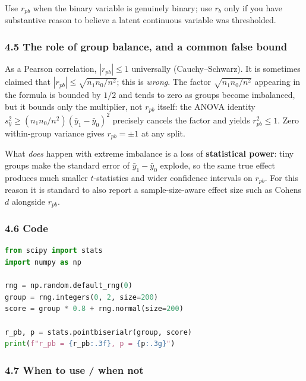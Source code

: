 \documentclass{article}
\begin{document}
Use \(r_{pb}\) when the binary variable is genuinely binary; use \(r_b\)
only if you have substantive reason to believe a latent continuous
variable was thresholded.

\subsubsection{\texorpdfstring{4.5 The role of group balance, and a
common false bound}{4.5 The role of group balance, and a common false bound}}\label{45-bound-on-r_pb}

As a Pearson correlation, \(|r_{pb}| \leq 1\) universally
(Cauchy--Schwarz). It is sometimes claimed that
\(|r_{pb}| \leq \sqrt{n_1 n_0 / n^2}\); this is \emph{wrong}. The factor
\(\sqrt{n_1 n_0 / n^2}\) appearing in the formula is bounded by \(1/2\)
and tends to zero as groups become imbalanced, but it bounds only the
multiplier, not \(r_{pb}\) itself: the ANOVA identity
\(s_y^2 \geq (n_1 n_0 / n^2)(\bar{y}_1 - \bar{y}_0)^2\) precisely
cancels the factor and yields \(r_{pb}^2 \leq 1\). Zero within-group
variance gives \(r_{pb} = \pm 1\) at any split.

What \emph{does} happen with extreme imbalance is a loss of
\textbf{statistical power}: tiny groups make the standard error of
\(\bar{y}_1 - \bar{y}_0\) explode, so the same true effect produces
much smaller \(t\)-statistics and wider confidence intervals on
\(r_{pb}\). For this reason it is standard to also report a
sample-size-aware effect size such as Cohen\textquotesingle s \(d\)
alongside \(r_{pb}\).

\subsubsection{4.6 Code}\label{46-code}

\begin{lstlisting}[language=Python]
from scipy import stats
import numpy as np

rng = np.random.default_rng(0)
group = rng.integers(0, 2, size=200)
score = group * 0.8 + rng.normal(size=200)

r_pb, p = stats.pointbiserialr(group, score)
print(f"r_pb = {r_pb:.3f}, p = {p:.3g}")
\end{lstlisting}

\subsubsection{4.7 When to use / when
not}\label{47-when-to-use--when-not}
\end{document}
